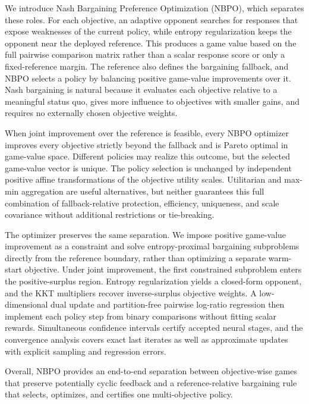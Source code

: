 \documentclass{article}
\theoremstyle{remark}
\theoremstyle{plain}
\newcommand{\NBPO}{\textsc{NBPO}}
\begin{document}
We introduce Nash Bargaining Preference Optimization (\NBPO{}), which separates these roles. For each objective, an adaptive opponent searches for responses that expose weaknesses of the current policy, while entropy regularization keeps the opponent near the deployed reference. This produces a game value based on the full pairwise comparison matrix rather than a scalar response score or only a fixed-reference margin. The reference also defines the bargaining fallback, and \NBPO{} selects a policy by balancing positive game-value improvements over it. Nash bargaining is natural because it evaluates each objective relative to a meaningful status quo, gives more influence to objectives with smaller gains, and requires no externally chosen objective weights.

When joint improvement over the reference is feasible, every \NBPO{} optimizer improves every objective strictly beyond the fallback and is Pareto optimal in game-value space. Different policies may realize this outcome, but the selected game-value vector is unique. The policy selection is unchanged by independent positive affine transformations of the objective utility scales. Utilitarian and max-min aggregation are useful alternatives, but neither guarantees this full combination of fallback-relative protection, efficiency, uniqueness, and scale covariance without additional restrictions or tie-breaking.

The optimizer preserves the same separation. We impose positive game-value improvement as a constraint and solve entropy-proximal bargaining subproblems directly from the reference boundary, rather than optimizing a separate warm-start objective. Under joint improvement, the first constrained subproblem enters the positive-surplus region. Entropy regularization yields a closed-form opponent, and the KKT multipliers recover inverse-surplus objective weights. A low-dimensional dual update and partition-free pairwise log-ratio regression then implement each policy step from binary comparisons without fitting scalar rewards. Simultaneous confidence intervals certify accepted neural stages, and the convergence analysis covers exact last iterates as well as approximate updates with explicit sampling and regression errors.

Overall, \NBPO{} provides an end-to-end separation between objective-wise games that preserve potentially cyclic feedback and a reference-relative bargaining rule that selects, optimizes, and certifies one multi-objective policy.
\end{document}
